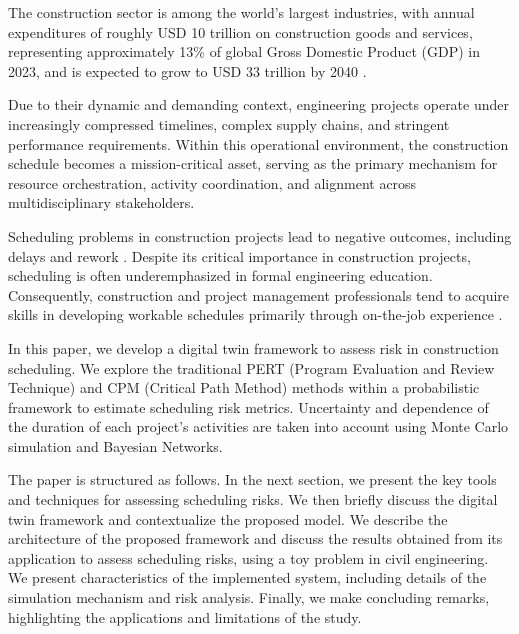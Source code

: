 The construction sector is among the world’s largest industries, with annual expenditures of roughly USD 10 trillion on construction goods and services, representing approximately 13\% of global Gross Domestic Product (GDP) in 2023, and is expected to grow to USD 33 trillion by 2040 \citep{Singh2026}. 

Due to their dynamic and demanding context, engineering projects operate under increasingly compressed timelines, complex supply chains, and stringent performance requirements. Within this operational environment, the construction schedule becomes a mission-critical asset, serving as the primary mechanism for resource orchestration, activity coordination, and alignment across multidisciplinary stakeholders.

Scheduling problems in construction projects lead to negative outcomes, including delays and rework \citep{Kline2025}. Despite its critical importance in construction projects, scheduling is often underemphasized in formal engineering education. Consequently, construction and project management professionals tend to acquire skills in developing workable schedules primarily through on-the-job experience \citep{Vahidi2025}.

In this paper, we develop a digital twin framework to assess risk in construction scheduling. We explore the traditional PERT (Program Evaluation and Review Technique) and CPM (Critical Path Method) methods within a probabilistic framework to estimate scheduling risk metrics. Uncertainty and dependence of the duration of each project's activities are taken into account using Monte Carlo simulation and Bayesian Networks. 

The paper is structured as follows. In the next section, we present the key tools and techniques for assessing scheduling risks. We then briefly discuss the digital twin framework and contextualize the proposed model. We describe the architecture of the proposed framework and discuss the results obtained from its application to assess scheduling risks, using a toy problem in civil engineering. We present characteristics of the implemented system, including details of the simulation mechanism and risk analysis. Finally, we make concluding remarks, highlighting the applications and limitations of the study.

